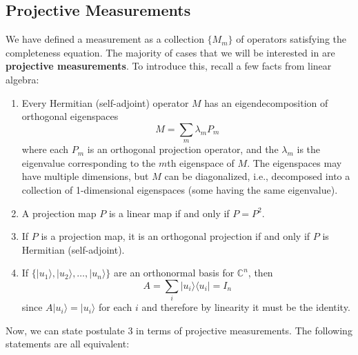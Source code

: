 \documentclass{article}
\theoremstyle{definition}
\begin{document}
\subsection*{Projective Measurements}
We have defined a measurement as a collection $\{ M_m\}$ of operators satisfying the completeness equation. The majority of cases that we will be interested in are \textbf{projective measurements}. To introduce this, recall a few facts from linear algebra:
\begin{enumerate}
  \item Every Hermitian (self-adjoint) operator $M$ has an eigendecomposition of orthogonal eigenspaces
    \[M = \sum_m \lambda_m P_m\]
  where each $P_m$ is an orthogonal projection operator, and the $\lambda_m$ is the eigenvalue corresponding to the $m$th eigenspace of $M$. The eigenspaces may have multiple dimensions, but $M$ can be diagonalized, i.e., decomposed into a collection of 1-dimensional eigenspaces (some having the same eigenvalue).
  \item A projection map $P$ is a linear map if and only if $P = P^2$.
  \item If $P$ is a projection map, it is an orthogonal projection if and only if $P$ is Hermitian (self-adjoint).
  \item If $\{ |u_1 \rangle, |u_2 \rangle, \ldots, |u_n \rangle \}$ are an orthonormal basis for $\mathbb{C}^n$, then
    \[A = \sum_i |u_i \rangle \langle u_i | = I_n\]
  since $A |u_i \rangle = |u_i \rangle$ for each $i$ and therefore by linearity it must be the identity.
\end{enumerate}
Now, we can state postulate 3 in terms of projective measurements. The following statements are all equivalent:
\end{document}
